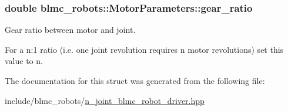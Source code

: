 \subsubsection[{\texorpdfstring{gear\+\_\+ratio}{gear_ratio}}]{\setlength{\rightskip}{0pt plus 5cm}double blmc\+\_\+robots\+::\+Motor\+Parameters\+::gear\+\_\+ratio}\hypertarget{structblmc__robots_1_1MotorParameters_a6a8158b9ac1633bab6181043d04ab655}{}\label{structblmc__robots_1_1MotorParameters_a6a8158b9ac1633bab6181043d04ab655}


Gear ratio between motor and joint. 

For a {\ttfamily n\+:1} ratio (i.\+e. one joint revolution requires n motor revolutions) set this value to {\ttfamily n}. 

The documentation for this struct was generated from the following file\+:\begin{DoxyCompactItemize}
\item 
include/blmc\+\_\+robots/\hyperlink{n__joint__blmc__robot__driver_8hpp}{n\+\_\+joint\+\_\+blmc\+\_\+robot\+\_\+driver.\+hpp}\end{DoxyCompactItemize}
